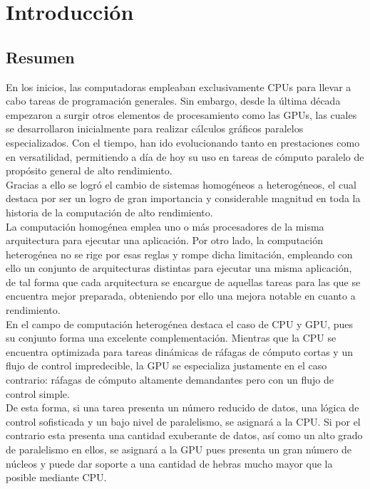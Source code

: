 \chapter{Introducción}

\section{Resumen}
En los inicios, las computadoras empleaban exclusivamente CPUs para llevar a cabo tareas de programación generales. Sin embargo, desde la última década empezaron a surgir otros elementos de procesamiento como las GPUs, las cuales se desarrollaron inicialmente para realizar cálculos gráficos paralelos especializados. Con el tiempo, han ido evolucionando tanto en prestaciones como en versatilidad, permitiendo a día de hoy su uso en tareas de cómputo paralelo de propósito general de alto rendimiento. \\
Gracias a ello se logró el cambio de sistemas homogéneos a heterogéneos, el cual destaca por ser un logro de gran importancia y considerable magnitud en toda la historia de la computación de alto rendimiento. \\
La computación homogénea emplea uno o más procesadores de la misma arquitectura para ejecutar una aplicación. Por otro lado, la computación heterogénea no se rige por esas reglas y rompe dicha limitación, empleando con ello un conjunto de arquitecturas distintas para ejecutar una misma aplicación, de tal forma que cada arquitectura se encargue de aquellas tareas para las que se encuentra mejor preparada, obteniendo por ello una mejora notable en cuanto a rendimiento. \\
En el campo de computación heterogénea destaca el caso de CPU y GPU, pues su conjunto forma una excelente complementación. Mientras que la CPU se encuentra optimizada para tareas dinámicas de ráfagas de cómputo cortas y un flujo de control impredecible, la GPU se especializa justamente en el caso contrario: ráfagas de cómputo altamente demandantes pero con un flujo de control simple. \\
De esta forma, si una tarea presenta un número reducido de datos, una lógica de control sofisticada y un bajo nivel de paralelismo, se asignará a la CPU. Si por el contrario esta presenta una cantidad exuberante de datos, así como un alto grado de paralelismo en ellos, se asignará a la GPU pues presenta un gran número de núcleos y puede dar soporte a una cantidad de hebras mucho mayor que la posible mediante CPU. \cite{Professional_CUDA_C} \\
